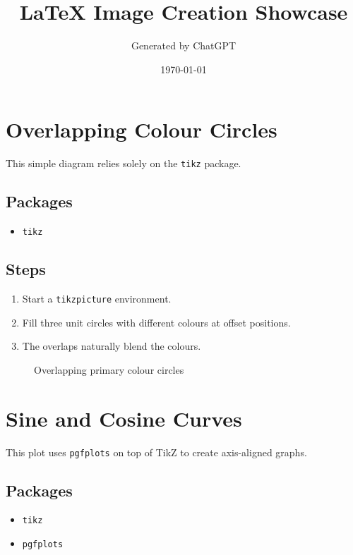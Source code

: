 \documentclass{article}
\title{LaTeX Image Creation Showcase}
\author{Generated by ChatGPT}
\date{\today}
\begin{document}
\maketitle
\tableofcontents

\newpage

\section{Overlapping Colour Circles}
This simple diagram relies solely on the \texttt{tikz} package.
\subsection*{Packages}
\begin{itemize}
    \item \texttt{tikz}
\end{itemize}
\subsection*{Steps}
\begin{enumerate}
    \item Start a \texttt{tikzpicture} environment.
    \item Fill three unit circles with different colours at offset positions.
    \item The overlaps naturally blend the colours.
\end{enumerate}
\begin{figure}[h!]
    \centering
    \caption{Overlapping primary colour circles}
\end{figure}

\newpage

\section{Sine and Cosine Curves}
This plot uses \texttt{pgfplots} on top of TikZ to create axis-aligned graphs.
\subsection*{Packages}
\begin{itemize}
    \item \texttt{tikz}
    \item \texttt{pgfplots}
\end{itemize}
\end{document}
